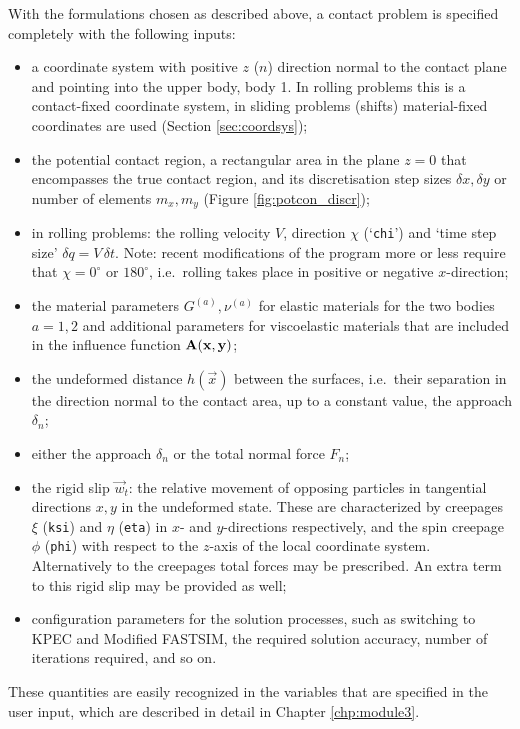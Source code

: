 \documentclass[12pt]{report}
\begin{document}
With the formulations chosen as described above, a contact problem is
specified completely with the following inputs:
\begin{itemize}
\item a coordinate system with positive $z$ ($n$) direction normal to the
        contact plane and pointing into the upper body, body 1. In
        rolling problems this is a contact-fixed coordinate system,
        in sliding problems (shifts) material-fixed coordinates are
        used (Section \ref{sec:coordsys});
\item the potential contact region, a rectangular area in the plane $z=0$
        that encompasses the true contact region, and its discretisation
        step sizes $\delta x,\delta y$ or number of elements $m_x,m_y$
        (Figure \ref{fig:potcon_discr});
\item in rolling problems: the rolling velocity $V$, direction $\chi$
        (`{\tt chi}') and `time step size' $\delta q=V\,\delta t$.
        Note: recent modifications of the program more or less require
        that $\chi=0^\circ$ or $180^\circ$, i.e.\ rolling takes place in
        positive or negative $x$-direction;
\item the material parameters $G^{(a)}, \nu^{(a)}$ for elastic materials
        for the two bodies $a=1,2$ and additional parameters for viscoelastic
        materials that are included in the influence function
        $\mathbf{A}(\mathbf{x},\mathbf{y})$;
\item the undeformed distance $h(\vec{x})$ between the surfaces, i.e.\ their
        separation in the direction normal to the contact area, up to a
        constant value, the approach $\delta_n$;
\item either the approach $\delta_n$ or the total normal force $F_n$;
\item the rigid slip $\vec{w}_t$:
        the relative movement of opposing particles
        in tangential directions $x,y$ in the undeformed state. These are
        characterized by creepages $\xi$ ({\tt ksi}) and $\eta$ ({\tt eta})
        in $x$- and $y$-directions respectively, and the spin creepage
        $\phi$ ({\tt phi}) with respect to the $z$-axis of the local
        coordinate system. Alternatively to the creepages total forces
        may be prescribed. An extra term to this rigid slip may be
        provided as well;
\item configuration parameters for the solution processes, such as
        switching to KPEC and Modified FASTSIM, the required solution
        accuracy, number of iterations required, and so on.
\end{itemize}
These quantities are easily recognized in the variables that are specified
in the user input, which are described in detail in Chapter
\ref{chp:module3}.
\end{document}
